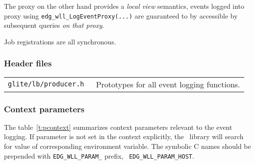 The \LB proxy on the other hand provides a \emph{local view}
semantics, events logged into proxy using
\verb'edg_wll_LogEventProxy(...)' are guaranteed to by accessible by
subsequent queries \emph{on that proxy}.

Job registrations are all synchronous.

\subsubsection{Header files}

\begin{table}[h]
\begin{tabularx}{\textwidth}{>{\tt}lX}
glite/lb/producer.h & Prototypes for all event logging functions. \\
\end{tabularx}
\end{table}

\subsubsection{Context parameters}
The table~\ref{t:pcontext} summarizes context parameters relevant to the
event logging. If  parameter is not set in the context explicitly, the
\LB\ library will search for value of corresponding environment
variable. The symbolic C names should be prepended with
\verb'EDG_WLL_PARAM_' prefix, \ie\ \verb'EDG_WLL_PARAM_HOST'.

